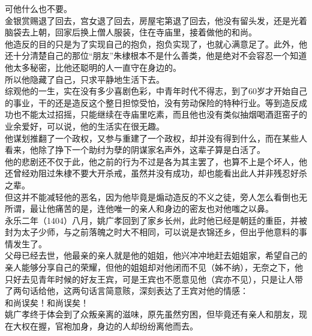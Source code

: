 \begin{multicols}{\theparacolNo}
可他什么也不要。\\

金银赏赐退了回去，宫女退了回去，房屋宅第退了回去，他没有留头发，还是光着脑袋去上朝，回家后换上僧人服装，住在寺庙里，接着做他的和尚。\\

他造反的目的只是为了实现自己的抱负，抱负实现了，也就心满意足了。此外，他还十分清楚自己的那位“朋友”朱棣根本不是什么善类，他是绝对不会容忍一个知道他太多秘密，比他还聪明的人一直守在身边的。\\

所以他隐藏了自己，只求平静地生活下去。\\

综观他的一生，实在没有多少喜剧色彩，中青年时代不得志，到了60岁才开始自己的事业，干的还是造反这个整日担惊受怕，没有劳动保险的特种行业。等到造反成功也不能太过招摇，只能继续在寺庙里吃素，而且他也没有类似抽烟喝酒逛窑子的业余爱好，可以说，他的生活实在很无趣。\\

他谋划推翻了一个政权，又参与重建了一个政权，却并没有得到什么，而在某些人看来，他除了挣下一个助纣为孽的阴谋家名声外，这辈子算是白活了。\\

他的悲剧还不仅于此，他之前的行为不过是各为其主罢了，也算不上是个坏人，他还曾经劝阻过朱棣不要大开杀戒，虽然并没有成功，却也能看出此人并非残忍好杀之辈。\\

但这并不能减轻他的恶名，因为他毕竟是煽动造反的不义之徒，旁人怎么看倒也无所谓，最让他痛苦的是，连他唯一的亲人和身边的密友也对他嗤之以鼻。\\

永乐二年（1404）八月，姚广孝回到了家乡长州，此时他已经是朝廷的重臣，并被封为太子少师，与之前落魄之时大不相同，可以说是衣锦还乡，但出乎他意料的事情发生了。\\

父母已经去世，他最亲的亲人就是他的姐姐，他兴冲冲地赶去姐姐家，希望自己的亲人能够分享自己的荣耀，但他的姐姐却对他闭而不见（姊不纳），无奈之下，他只好去见青年时候的好友王宾，可是王宾也不愿意见他（宾亦不见），只是让人带了两句话给他，这两句话言简意赅，深刻表达了王宾对他的情感：\\

和尚误矣！和尚误矣！\\

姚广孝终于体会到了众叛亲离的滋味，原先虽然穷困，但毕竟还有亲人和朋友，现在大权在握，官袍加身，身边的人却纷纷离他而去。\\


\end{multicols}
